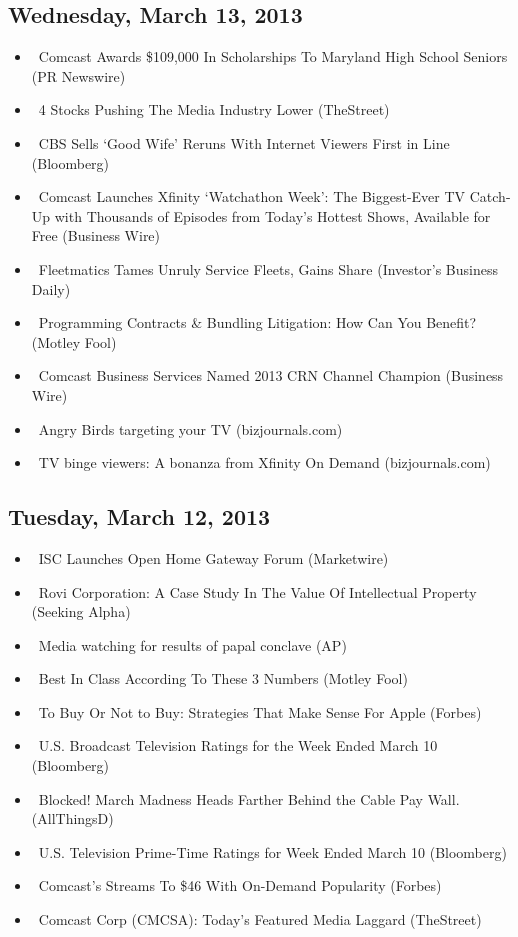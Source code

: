 \documentclass[11pt,asymmetric]{article}
\begin{document}
\subsection*{Wednesday, March 13, 2013}
\begin{itemize}
\item\ Comcast Awards \$109,000 In Scholarships To Maryland High School Seniors (PR Newswire)
\item\ 4 Stocks Pushing The Media Industry Lower (TheStreet)
\item\ CBS Sells ‘Good Wife’ Reruns With Internet Viewers First in Line (Bloomberg)
\item\ Comcast Launches Xfinity ‘Watchathon Week’: The Biggest-Ever TV Catch-Up with Thousands of Episodes from Today’s Hottest Shows, Available for Free (Business Wire)
\item\ Fleetmatics Tames Unruly Service Fleets, Gains Share (Investor's Business Daily)
\item\ Programming Contracts \& Bundling Litigation: How Can You Benefit? (Motley Fool)
\item\ Comcast Business Services Named 2013 CRN Channel Champion (Business Wire)
\item\ Angry Birds targeting your TV (bizjournals.com)
\item\ TV binge viewers: A bonanza from Xfinity On Demand (bizjournals.com)
\end{itemize}
\subsection*{Tuesday, March 12, 2013}
\begin{itemize}
\item\ ISC Launches Open Home Gateway Forum (Marketwire)
\item\ Rovi Corporation: A Case Study In The Value Of Intellectual Property (Seeking Alpha)
\item\ Media watching for results of papal conclave (AP)
\item\ Best In Class According To These 3 Numbers (Motley Fool)
\item\ To Buy Or Not to Buy: Strategies That Make Sense For Apple (Forbes)
\item\ U.S. Broadcast Television Ratings for the Week Ended March 10 (Bloomberg)
\item\ Blocked! March Madness Heads Farther Behind the Cable Pay Wall. (AllThingsD)
\item\ U.S. Television Prime-Time Ratings for Week Ended March 10 (Bloomberg)
\item\ Comcast's Streams To \$46 With On-Demand Popularity (Forbes)
\item\ Comcast Corp (CMCSA): Today's Featured Media Laggard (TheStreet)
\end{itemize}
\end{document}
